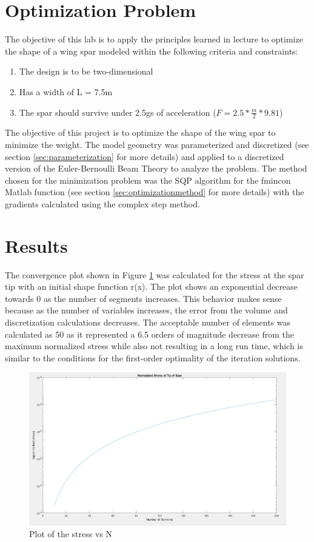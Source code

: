\documentclass[11pt]{article}%
\begin{document}
\section{Optimization Problem}
\label{sec:problem}
The objective of this lab is to apply the principles learned in lecture to optimize the shape of a wing spar modeled within the following criteria and constraints\cite{lab2doc}:
\begin{enumerate}
	\item The design is to be two-dimensional 
	\item Has a width of L = 7.5m 
	\item The spar should survive under 2.5gs of acceleration ($F=2.5*\frac{m}{2}*9.81$)
\end{enumerate}
The objective of this project is to optimize the shape of the wing spar to minimize the weight. The model geometry was parameterized and discretized (see section \ref{sec:parameterization} for more details) and applied to a discretized version of the Euler-Bernoulli Beam Theory to analyze the problem. The method chosen for the minimization problem was the SQP algorithm for the fmincon Matlab function (see section \ref{sec:optimizationmethod} for more details) with the gradients calculated using the complex step method.
\section{Results}
The convergence plot shown in Figure \ref{fig:conv} was calculated for the stress at the spar tip with an initial shape function r(x). The plot shows an exponential decrease towards 0 as the number of segments increases. This behavior makes sense because as the number of variables increases, the error from the volume and discretization calculations decreases. The acceptable number of elements was calculated as 50 as it represented a 6.5 orders of magnitude decrease from the maximum normalized stress while also not resulting in a long run time, which is similar to the conditions for the first-order optimality of the iteration solutions.
\begin{figure}[h!]
    \centering
    \includegraphics[width=0.75\linewidth]{convergence.png}
    \caption{ Plot of the  stress vs N }
    \label{fig:conv}
\end{figure}
\end{document}
